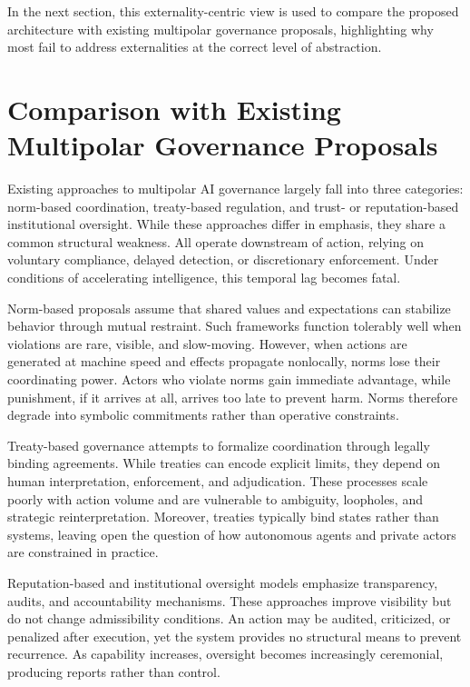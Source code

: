 \documentclass[11pt,oneside]{article}
\begin{document}
In the next section, this externality-centric view is used to compare the proposed architecture with existing multipolar governance proposals, highlighting why most fail to address externalities at the correct level of abstraction.

\section{Comparison with Existing Multipolar Governance Proposals}

Existing approaches to multipolar AI governance largely fall into three categories: norm-based coordination, treaty-based regulation, and trust- or reputation-based institutional oversight. While these approaches differ in emphasis, they share a common structural weakness. All operate downstream of action, relying on voluntary compliance, delayed detection, or discretionary enforcement. Under conditions of accelerating intelligence, this temporal lag becomes fatal.

Norm-based proposals assume that shared values and expectations can stabilize behavior through mutual restraint. Such frameworks function tolerably well when violations are rare, visible, and slow-moving. However, when actions are generated at machine speed and effects propagate nonlocally, norms lose their coordinating power. Actors who violate norms gain immediate advantage, while punishment, if it arrives at all, arrives too late to prevent harm. Norms therefore degrade into symbolic commitments rather than operative constraints.

Treaty-based governance attempts to formalize coordination through legally binding agreements. While treaties can encode explicit limits, they depend on human interpretation, enforcement, and adjudication. These processes scale poorly with action volume and are vulnerable to ambiguity, loopholes, and strategic reinterpretation. Moreover, treaties typically bind states rather than systems, leaving open the question of how autonomous agents and private actors are constrained in practice.

Reputation-based and institutional oversight models emphasize transparency, audits, and accountability mechanisms. These approaches improve visibility but do not change admissibility conditions. An action may be audited, criticized, or penalized after execution, yet the system provides no structural means to prevent recurrence. As capability increases, oversight becomes increasingly ceremonial, producing reports rather than control.
\end{document}
